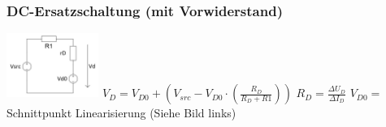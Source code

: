 \documentclass[margin=normal]{tex/hsrzf}
\begin{document}
\begin{multicols}{2}
  \subsubsection*{DC-Ersatzschaltung (mit Vorwiderstand)}
  \includegraphics[width = 3cm]{img/Halbleiter/DCErsatzschaltungDiode.png}
  \small
  \newline$V_D = V_{D0} + (V_{src} - V_{D0} \cdot (\frac{R_D}{R_D + R1}))$
  \newline $R_D = \frac{\Delta U_D}{\Delta I_D}$
  \newline $V_{D0} =$ Schnittpunkt Linearisierung (Siehe Bild links)
  \normalsize
\end{multicols}
\end{document}
